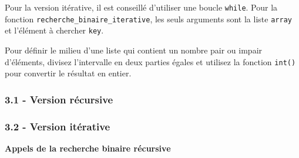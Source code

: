 \begin{Exercice}[20 minutes] [Python]
\begin{conseil}
            Pour la version itérative, il est conseillé d'utiliser une boucle \lstinline{while}. Pour la fonction \lstinline{recherche_binaire_iterative}, les seuls arguments sont la liste \texttt{array} et l'élément à chercher \lstinline{key}. 
        \end{conseil}

        \begin{conseil}
            Pour définir le milieu d'une liste qui contient un nombre pair ou impair d'éléments, divisez l'intervalle en deux parties égales et utilisez la fonction \lstinline{int()} pour convertir le résultat en entier. 
            
        \end{conseil}
    
        \begin{solution}
            \subsubsection*{3.1 - Version récursive}
            
        \end{solution}
        \begin{solution}
            \subsubsection*{3.2 - Version itérative}
            
        \end{solution}
        \begin{solution}
        \begin{minipage}{\linewidth}
        \textbf{Appels de la recherche binaire récursive}


\end{minipage}
\end{solution}
\end{Exercice}
